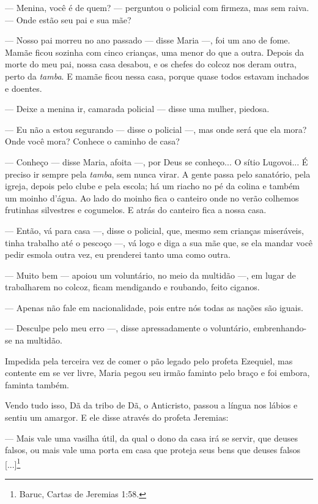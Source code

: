 --- Menina, você é de quem? --- perguntou o policial com firmeza, mas
sem raiva. --- Onde estão seu pai e sua mãe?

--- Nosso pai morreu no ano passado --- disse Maria ---, foi um ano de
fome. Mamãe ficou sozinha com cinco crianças, uma menor do que a outra.
Depois da morte do meu pai, nossa casa desabou, e os chefes do colcoz
nos deram outra, perto da \emph{tamba}. E mamãe ficou nessa casa, porque
quase todos estavam inchados e doentes.

--- Deixe a menina ir, camarada policial --- disse uma mulher, piedosa.

--- Eu não a estou segurando --- disse o policial ---, mas onde será que
ela mora? Onde você mora? Conhece o caminho de casa?

--- Conheço --- disse Maria, afoita ---, por Deus se conheço... O sítio
Lugovoi... É preciso ir sempre pela \emph{tamba}, sem nunca virar. A
gente passa pelo sanatório, pela igreja, depois pelo clube e pela
escola; há um riacho no pé da colina e também um moinho d'água. Ao lado
do moinho fica o canteiro onde no verão colhemos frutinhas silvestres e
cogumelos. E atrás do canteiro fica a nossa casa.

--- Então, vá para casa ---, disse o policial, que, mesmo sem crianças
miseráveis, tinha trabalho até o pescoço ---, vá logo e diga a sua mãe
que, se ela mandar você pedir esmola outra vez, eu prenderei tanto uma
como outra.

--- Muito bem --- apoiou um voluntário, no meio da multidão ---, em
lugar de trabalharem no colcoz, ficam mendigando e roubando, feito
ciganos.

--- Apenas não fale em nacionalidade, pois entre nós todas as nações são
iguais.

--- Desculpe pelo meu erro ---, disse apressadamente o voluntário,
embrenhando-se na multidão.

Impedida pela terceira vez de comer o pão legado pelo profeta Ezequiel,
mas contente em se ver livre, Maria pegou seu irmão faminto pelo braço e
foi embora, faminta também.

Vendo tudo isso, Dã da tribo de Dã, o Anticristo, passou a língua nos
lábios e sentiu um amargor. E ele disse através do profeta Jeremias:

--- Mais vale uma vasilha útil, da qual o dono da casa irá se servir,
que deuses falsos, ou mais vale uma porta em casa que proteja seus bens
que deuses falsos {[}...{]}\footnote{Baruc, Cartas de Jeremias 1:58.}

